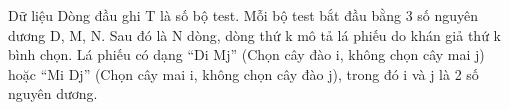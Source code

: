 Dữ liệu  
Dòng đầu ghi T là số bộ test. Mỗi bộ test bắt đầu bằng 3 số nguyên dương D, M, N. Sau đó là N dòng, dòng thứ k mô tả lá phiếu do khán giả thứ k bình chọn. Lá phiếu có dạng “Di Mj” (Chọn cây đào i, không chọn cây mai j) hoặc “Mi Dj” (Chọn cây mai i, không chọn cây đào j), trong đó i và j là 2 số nguyên dương.